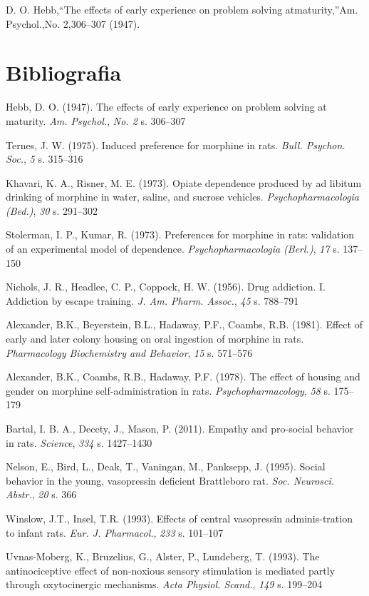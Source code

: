 \documentclass[12pt]{article}
\newcommand{\apaartykul}[6]{#1 (#2). #3. \textit{#4}, \textit{#5} s. #6}
\begin{document}
D. O. Hebb,“The effects of early experience on problem solving atmaturity,”Am. Psychol.,No. 2,306–307 (1947).
\fi

\pagebreak

\section{Bibliografia}

\apaartykul{Hebb, D. O.}{1947}{The effects of early experience on problem solving at maturity}{Am. Psychol.}{No. 2}{306--307}

\apaartykul{Ternes, J. W.}{1975}{Induced preference for morphine in rats}{Bull. Psychon. Soc.}{5}{315--316}

\apaartykul{Khavari, K. A., Risner, M. E.}{1973}{Opiate dependence produced by ad libitum drinking of morphine in water, saline, and sucrose vehicles}{Psychopharmacologia (Bed.)}{30}{291--302}

\apaartykul{Stolerman, I. P., Kumar, R.}{1973}{Preferences for morphine in rats: validation of an experimental model of dependence}{Psychopharmacologia (Berl.)}{17}{137--150}

\apaartykul{Nichols, J. R., Headlee, C. P., Coppock, H. W.}{1956}{Drug addiction. I. Addiction by escape training}{J. Am. Pharm. Assoc.}{45}{788--791}

\apaartykul{Alexander, B.K., Beyerstein, B.L., Hadaway, P.F., Coambs, R.B.}{1981}{Effect of early and later colony housing on oral ingestion of morphine in rats}{Pharmacology Biochemistry and Behavior}{15}{571--576}

\apaartykul{Alexander, B.K., Coambs, R.B., Hadaway, P.F.}{1978}{The effect of housing and gender on morphine self-administration in rats}{Psychopharmacology}{58}{175--179}

\apaartykul{Bartal, I. B. A., Decety, J., Mason, P.}{2011}{Empathy and pro-social behavior in rats}{Science}{334}{1427--1430}

\apaartykul{Nelson, E., Bird, L., Deak, T., Vaningan, M., Panksepp, J.}{1995}{Social behavior in the young, vasopressin deficient Brattleboro rat}{Soc. Neurosci. Abstr.}{20}{366}

\apaartykul{Winslow, J.T., Insel, T.R.}{1993}{Effects of central vasopressin adminis-tration to infant rats}{Eur. J. Pharmacol.}{233}{101–107}

\apaartykul{Uvnas-Moberg, K., Bruzelius, G., Alster, P., Lundeberg, T.}{1993}{The antinociceptive effect of non-noxious sensory stimulation is mediated partly through oxytocinergic mechanisms}{Acta Physiol. Scand.}{149}{199–204}
\end{document}
